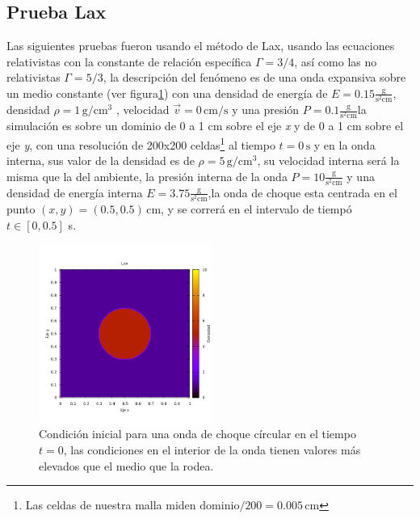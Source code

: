 \documentclass[12pt,a4paper]{book}
\begin{document}
\subsection{Prueba Lax} \label{subsec: Prueba Lax}
Las siguientes pruebas fueron usando el método de Lax, usando las ecuaciones relativistas con la constante de relación específica $\Gamma = 3/4$, así como las no relativistas $\Gamma = 5/3$, la descripción del fenómeno es de una onda expansiva sobre un medio constante (ver figura\ref{fig:onda_choque1_t_0}) con una densidad de energía de $E = 0.15 \frac{\mathrm{g}}{\mathrm{s}^2 \mathrm{cm}}$, densidad $\rho = 1 \, \mathrm{g}/\mathrm{cm}^3$ , velocidad $\vec{v} = 0 \, \mathrm{cm}/\mathrm{s}$ y una presión $P=0.1 \frac{\mathrm{g}}{\mathrm{s}^2 \mathrm{cm}} $la simulación es sobre un dominio de 0 a 1 cm sobre el eje \emph{x} y de 0 a 1 cm sobre el eje \emph{y}, con una resolución de 200x200 celdas\footnote{Las celdas de nuestra malla miden $\mathrm{dominio}/200= 0.005 \, \mathrm{cm}$} al tiempo $t=0 \, \mathrm{s}$  y en la onda interna, sus valor de la densidad es de $\rho=5 \, \mathrm{g}/\mathrm{cm}^3$, su velocidad interna será la misma que la del ambiente, la presión interna de la onda $P=10 \frac{\mathrm{g}}{\mathrm{s}^2 \mathrm{cm}}$ y una densidad de energía interna $E = 3.75 \frac{\mathrm{g}}{\mathrm{s}^2 \mathrm{cm}}$,la onda de choque esta centrada en el punto $(x,y) = (0.5, 0.5) \, \mathrm{cm}$, y se correrá en el intervalo de tiempó $t \in \left[ 0 , 0.5 \right]$ s.
\begin{figure}[H]
\centering
\includegraphics[width=0.5\textwidth]{./Figuras/Pruebas/Prueba_onda_choque/onda_choque1_t_0}
\caption{Condición inicial para una onda de choque círcular en el tiempo $t = 0$, las condiciones en el interior de la onda tienen valores más elevados que el medio que la rodea.} \label{fig:onda_choque1_t_0}
\end{figure}
\end{document}
